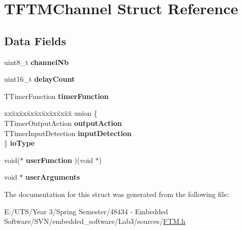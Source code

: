 \hypertarget{struct_t_f_t_m_channel}{}\section{T\+F\+T\+M\+Channel Struct Reference}
\label{struct_t_f_t_m_channel}
\subsection*{Data Fields}
\begin{DoxyCompactItemize}
\item 
\hypertarget{struct_t_f_t_m_channel_aa2404895d5318fcd6aecab3147c14826}{}uint8\+\_\+t {\bfseries channel\+Nb}\label{struct_t_f_t_m_channel_aa2404895d5318fcd6aecab3147c14826}

\item 
\hypertarget{struct_t_f_t_m_channel_abb555760e71da6a4822a1ace343381f2}{}uint16\+\_\+t {\bfseries delay\+Count}\label{struct_t_f_t_m_channel_abb555760e71da6a4822a1ace343381f2}

\item 
\hypertarget{struct_t_f_t_m_channel_aa5f3d62a353d779117ced0877fa47734}{}T\+Timer\+Function {\bfseries timer\+Function}\label{struct_t_f_t_m_channel_aa5f3d62a353d779117ced0877fa47734}

\item 
\hypertarget{struct_t_f_t_m_channel_ae805c26feb6a74fbfa4b5bafbb2d6770}{}\begin{tabbing}
xx\=xx\=xx\=xx\=xx\=xx\=xx\=xx\=xx\=\kill
union \{\\
\>TTimerOutputAction {\bfseries outputAction}\\
\>TTimerInputDetection {\bfseries inputDetection}\\
\} {\bfseries ioType}\label{struct_t_f_t_m_channel_ae805c26feb6a74fbfa4b5bafbb2d6770}
\\

\end{tabbing}\item 
\hypertarget{struct_t_f_t_m_channel_af3920191861032f55e27bd4fd42cb29a}{}void($\ast$ {\bfseries user\+Function} )(void $\ast$)\label{struct_t_f_t_m_channel_af3920191861032f55e27bd4fd42cb29a}

\item 
\hypertarget{struct_t_f_t_m_channel_a975090ae478158776d52eb24660021d6}{}void $\ast$ {\bfseries user\+Arguments}\label{struct_t_f_t_m_channel_a975090ae478158776d52eb24660021d6}

\end{DoxyCompactItemize}


The documentation for this struct was generated from the following file\+:\begin{DoxyCompactItemize}
\item 
E\+:/\+U\+T\+S/\+Year 3/\+Spring Semester/48434 -\/ Embedded Software/\+S\+V\+N/embedded\+\_\+software/\+Lab3/sources/\hyperlink{_f_t_m_8h}{F\+T\+M.\+h}\end{DoxyCompactItemize}
